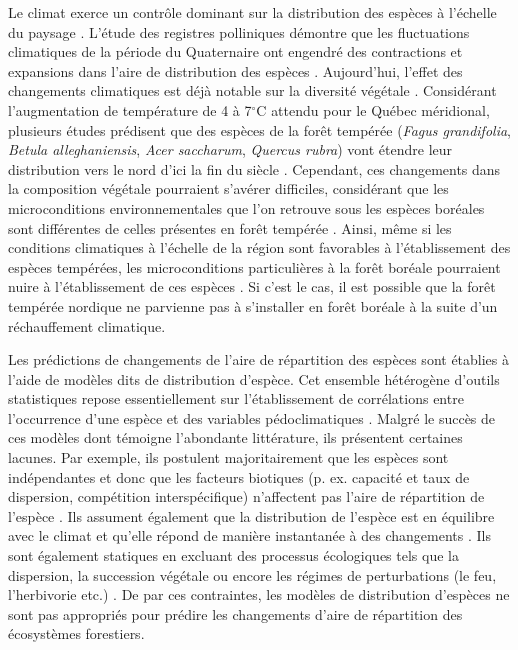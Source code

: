 Le climat exerce un contrôle dominant sur la distribution des espèces à l'échelle du paysage
\citep{Pearson2003b}. L'étude des registres polliniques démontre que les fluctuations climatiques
de la période du Quaternaire ont engendré des contractions et expansions dans l'aire de distribution
des espèces \citep{Davis2001}. Aujourd'hui, l'effet des changements climatiques est déjà notable sur
la diversité végétale \citep{Walther2002a,Parmesan2006}. Considérant l'augmentation de température
de 4 à 7$^\circ$C \citep[Scénario RCP 8.5]{Climatique2015} attendu pour le Québec méridional,
plusieurs études prédisent que des espèces de la forêt tempérée (\textit{Fagus grandifolia},
\textit{Betula alleghaniensis}, \textit{Acer saccharum}, \textit{Quercus rubra}) vont étendre leur
distribution vers le nord d'ici la fin du siècle \citep{Iverson2002,Sciences2014}. Cependant, ces
changements dans la composition végétale pourraient s'avérer difficiles, considérant que les
microconditions environnementales que l’on retrouve sous les espèces boréales sont différentes de
celles présentes en forêt tempérée \citep{Barras1998,Caspersen2005}. Ainsi, même si les conditions
climatiques à l'échelle de la région sont favorables à l'établissement des espèces tempérées, les
microconditions particulières à la forêt boréale pourraient nuire à l'établissement de ces espèces \citep{DeFrenne2013,Lafleur2010}. Si c’est le cas, il est possible que la forêt tempérée
nordique ne parvienne pas à s'installer en forêt boréale à la suite d’un réchauffement climatique.

Les prédictions de changements de l'aire de répartition des espèces sont établies à l'aide de
modèles dits de distribution d'espèce. Cet ensemble hétérogène d'outils statistiques repose
essentiellement sur l'établissement de corrélations entre l'occurrence d'une espèce et des variables
pédoclimatiques \citep{Pearson2003b, Guisan2005a}. Malgré le succès de ces modèles dont témoigne
l'abondante littérature, ils présentent certaines lacunes. Par exemple, ils postulent majoritairement
que les espèces sont indépendantes et donc que les facteurs biotiques (p. ex. capacité et taux de
dispersion, compétition interspécifique) n'affectent pas l'aire de répartition de l'espèce
\citep{Guisan2005a,Pearson2003b}. Ils assument également que la distribution de l'espèce est en
équilibre avec le climat et qu'elle répond de manière instantanée à des changements
\citep{Austin2002}. Ils sont également statiques en excluant des processus écologiques tels que la
dispersion, la succession végétale ou encore les régimes de perturbations (le feu, l'herbivorie
etc.) \citep{Austin2002,Guisan2005a}. De par ces contraintes, les modèles de distribution d'espèces
ne sont pas appropriés pour prédire les changements d'aire de répartition des écosystèmes
forestiers.

